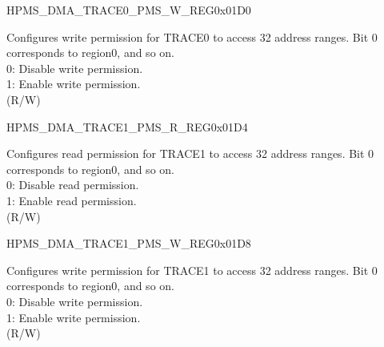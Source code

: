 \begin{register}{H}{PMS\_DMA\_TRACE0\_PMS\_W\_REG}{0x01D0}\label{regdesc:PMSDMATRACE0PMSWREG}
%
\regnewline%
\begin{regdesc}\begin{reglist}
\label{fielddesc:PMSDMATRACE0WPMS}\item [PMS\_DMA\_TRACE0\_W\_PMS] Configures write permission for TRACE0 to access 32 address ranges. Bit 0 corresponds to region0, and so on.\\
0: Disable write permission.\\
1: Enable write permission.\\ (R/W)
\end{reglist}\end{regdesc}
\end{register}


\begin{register}{H}{PMS\_DMA\_TRACE1\_PMS\_R\_REG}{0x01D4}\label{regdesc:PMSDMATRACE1PMSRREG}
%
\regnewline%
\begin{regdesc}\begin{reglist}
\label{fielddesc:PMSDMATRACE1RPMS}\item [PMS\_DMA\_TRACE1\_R\_PMS] Configures read permission for TRACE1 to access 32 address ranges. Bit 0 corresponds to region0, and so on.\\
0: Disable read permission.\\
1: Enable read permission.\\ (R/W)
\end{reglist}\end{regdesc}
\end{register}


\begin{register}{H}{PMS\_DMA\_TRACE1\_PMS\_W\_REG}{0x01D8}\label{regdesc:PMSDMATRACE1PMSWREG}
%
\regnewline%
\begin{regdesc}\begin{reglist}
\label{fielddesc:PMSDMATRACE1WPMS}\item [PMS\_DMA\_TRACE1\_W\_PMS] Configures write permission for TRACE1 to access 32 address ranges. Bit 0 corresponds to region0, and so on.\\
0: Disable write permission.\\
1: Enable write permission.\\ (R/W)
\end{reglist}\end{regdesc}
\end{register}


